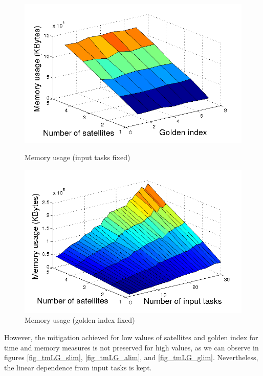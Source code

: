 \begin{figure}[ht]
  \begin{minipage}[b]{0.5\linewidth}
    \includegraphics[width=\linewidth]{Figures/mLG_tasksfix.png}
    \caption{Memory usage (input tasks fixed)}\label{fig_mLG_tasksfix}
  \end{minipage}  
  \begin{minipage}[b]{0.5\linewidth}
    \includegraphics[width=\linewidth]{Figures/mLG_goldenfix.png}
    \caption{Memory usage (golden index fixed)}\label{fig_mLG_goldenfix}
  \end{minipage}
  \hfill
\end{figure}

However, the mitigation achieved for low values of satellites and golden index for time and memory measures is not preserved for high values, as we can observe in figures \ref{fig_tmLG_slim}, \ref{fig_tmLG_alim}, and \ref{fig_tmLG_glim}. Nevertheless, the linear dependence from input tasks is kept.


